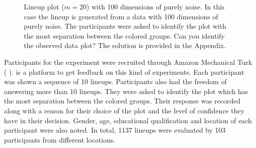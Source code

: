 \documentclass[12]{article}
\begin{document}
\begin{figure}[hbtp]
   \centering
       \caption{Lineup plot ($m=20$) with 100 dimensions of purely noise. In this case the lineup is generated from a data with 100 dimensions of purely noise. The participants were asked to identify the plot with the most separation between the colored groups. Can you identify the observed data plot? The solution is provided in the Appendix. }
       \label{fig:test_category}
\end{figure}

Participants  for the experiment were recruited through Amazon Mechanical Turk ( \cite{turk} ).  \cite{turk} is a platform to get feedback on this kind of experiments. Each participant was shown a sequence of 10 lineups. Participants also had the freedom of answering more than 10 lineups. They were asked to identify the plot which has the most separation between the colored groups. Their response was recorded along with a reason for their choice of the plot and the level of confidence they have in their decision.  Gender, age, educational qualification and location of each participant were also noted. In total, 1137 lineups were evaluated by 103 participants from different locations.


\end{document}
